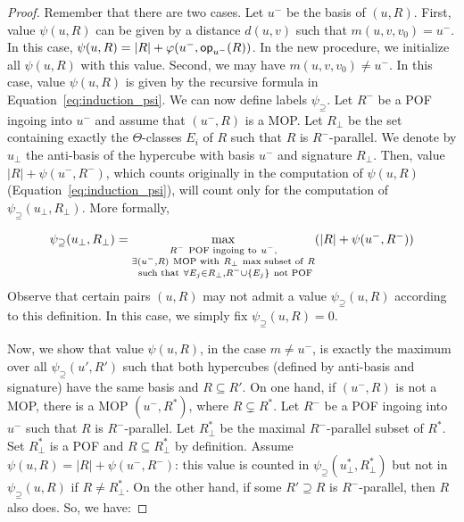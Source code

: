 \documentclass[a4paper,UKenglish,numberwithinsect,cleveref, autoref,anonymous]{lipics-v2021}
\newcommand{\set}[1]{\left\{ #1 \right\}}
\newcommand{\card}[1]{\left| #1 \right|}
\newcommand{\opp}{\mbox{\textsf{op}}}
\newcommand{\psis}{\psi_{\supseteq}}
\begin{document}
\begin{proof}
Remember that there are two cases. Let $u^-$ be the basis of $(u,R)$. First, value $\psi(u,R)$ can be given by a distance $d(u,v)$ such that $m(u,v,v_0) = u^-$. In this case, $\psi(u,R) = \card{R} + \varphi(u^-,\opp_{u^-}(R))$. In the new procedure, we initialize all $\psi(u,R)$ with this value. Second, we may have $m(u,v,v_0) \neq u^-$. In this case, value $\psi(u,R)$ is given by the recursive formula in Equation~\eqref{eq:induction_psi}. We can now define labels $\psis$. Let $R^-$ be a POF ingoing into $u^-$ and assume that $(u^-,R)$ is a MOP. Let $R_{\perp}$ be the set containing exactly the $\Theta$-classes $E_i$ of $R$ such that $R$ is $R^-$-parallel. We denote by $u_{\perp}$ the anti-basis of the hypercube with basis $u^-$ and signature $R_{\perp}$. Then, value $\card{R} + \psi(u^-,R^-)$, which counts originally in the computation of $\psi(u,R)$ (Equation~\eqref{eq:induction_psi}), will count only for the computation of $\psis(u_{\perp},R_{\perp})$. More formally,

\begin{equation}
    \psis(u_{\perp},R_{\perp}) = \max\limits_{\substack{R^- ~\mbox{\scriptsize{POF ingoing to}}~ u^-, \\ \exists (u^-,R) ~\mbox{\scriptsize{MOP with}}~ R_{\perp} ~\mbox{\scriptsize{max subset of}}~ R\\ ~\mbox{\scriptsize{such that}}~ \forall E_j \in R_{\perp}, R^- \cup \set{E_j} ~\mbox{\scriptsize{not POF}}}} (\card{R} + \psi(u^-,R^-))
    \label{eq:induction_psi_mop}
\end{equation}
Observe that certain pairs $(u,R)$ may not admit a value $\psis(u,R)$ according to this definition. In this case, we simply fix $\psis(u,R) = 0$.

Now, we show that value $\psi(u,R)$, in the case $m\neq u^-$, is exactly the maximum over all $\psis(u',R')$ such that both hypercubes (defined by anti-basis and signature) have the same basis and $R \subseteq R'$. On one hand, if $(u^-,R)$ is not a MOP, there is a MOP $(u^-,R^*)$, where $R \subsetneq R^*$. Let $R^-$ be a POF ingoing into $u^-$ such that $R$ is $R^-$-parallel. Let $R_{\perp}^*$ be the maximal $R^-$-parallel subset of $R^*$. Set $R_{\perp}^*$ is a POF and $R \subseteq R_{\perp}^*$ by definition. Assume $\psi(u,R) = \card{R} + \psi(u^-,R^-)$: this value is counted in $\psis(u_{\perp}^*,R_{\perp}^*)$ but not in $\psis(u,R)$ if $R\neq R_{\perp}^*$. On the other hand, if some $R' \supseteq R$ is $R^-$-parallel, then $R$ also does. So, we have:


\end{proof}
\end{document}
